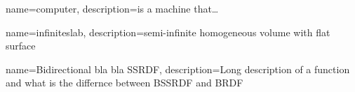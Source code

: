 {
    name=computer,
    description={is a machine that\ldots}
}

{
    name={infiniteslab},
    description={semi-infinite homogeneous volume with flat surface}
}

{
    name={Bidirectional bla bla SSRDF},
    description={Long description of a function and what is the differnce
    between BSSRDF and BRDF}
}
